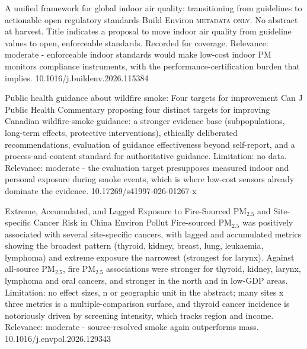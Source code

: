 \documentclass[10pt]{article}
\begin{document}
{A unified framework for global indoor air quality: transitioning from guidelines to actionable open regulatory standards}
{Build Environ}
{\textsc{metadata only.} No abstract at harvest. Title indicates a proposal to move indoor air quality from guideline values to open, enforceable standards. Recorded for coverage. Relevance: moderate - enforceable indoor standards would make low-cost indoor PM monitors compliance instruments, with the performance-certification burden that implies.}
{10.1016/j.buildenv.2026.115384}

\par{}\baselineskip{}\baselineskip
{}

{Public health guidance about wildfire smoke: Four targets for improvement}
{Can J Public Health}
{Commentary proposing four distinct targets for improving Canadian wildfire-smoke guidance: a stronger evidence base (subpopulations, long-term effects, protective interventions), ethically deliberated recommendations, evaluation of guidance effectiveness beyond self-report, and a process-and-content standard for authoritative guidance. Limitation: no data. Relevance: moderate - the evaluation target presupposes measured indoor and personal exposure during smoke events, which is where low-cost sensors already dominate the evidence.}
{10.17269/s41997-026-01267-x}

\par{}\baselineskip{}\baselineskip
{}

{Extreme, Accumulated, and Lagged Exposure to Fire-Sourced PM$_{2.5}$ and Site-specific Cancer Risk in China}
{Environ Pollut}
{Fire-sourced PM$_{2.5}$ was positively associated with several site-specific cancers, with lagged and accumulated metrics showing the broadest pattern (thyroid, kidney, breast, lung, leukaemia, lymphoma) and extreme exposure the narrowest (strongest for larynx). Against all-source PM$_{2.5}$, fire PM$_{2.5}$ associations were stronger for thyroid, kidney, larynx, lymphoma and oral cancers, and stronger in the north and in low-GDP areas. Limitation: no effect sizes, n or geographic unit in the abstract; many sites x three metrics is a multiple-comparison surface, and thyroid cancer incidence is notoriously driven by screening intensity, which tracks region and income. Relevance: moderate - source-resolved smoke again outperforms mass.}
{10.1016/j.envpol.2026.129343}
\end{document}
